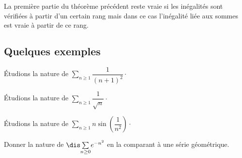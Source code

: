 \documentclass[french,11pt,twoside]{VcCours}
\newcommand{\Sum}[2]{\ensuremath{\textstyle{\sum\limits_{#1}^{#2}}}}
\begin{document}
\begin{rem} La première partie du théorème précédent reste vraie si les inégalités sont vérifiées à partir d'un certain rang mais dans ce cas l'inégalité liée aux sommes est vraie à partir de ce rang.
\end{rem}


\subsection{Quelques exemples}

\newpage
\begin{exems}
\item Étudions la nature de $\Sum{n \geq 1}{} \dfrac{1}{(n+1)^2}\cdot$

\vspace{3cm}
\item Étudions la nature de $\Sum{n \geq 1}{} \dfrac{1}{\sqrt{n}} \cdot$

\vspace{3cm}
%
\item Étudions la nature de $\Sum{n \geq 1}{} n \sin \left(\dfrac{1}{n^2}\right) \cdot$

\vspace{3cm}
%
\end{exems}

\begin{exa} Donner la nature de $ \dis \Sum{n \geq 0}{}  e^{-n^2}$ en la comparant à une série géométrique.
\end{exa}
\end{document}

